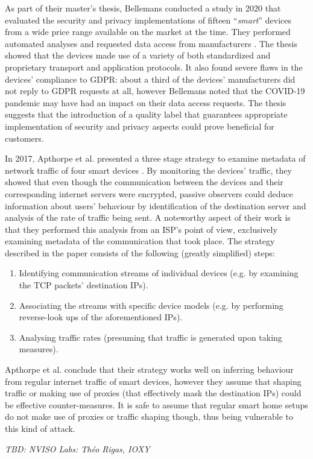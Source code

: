 As part of their master's thesis, Bellemans conducted a study in 2020 that evaluated the security and privacy implementations of fifteen \enquote{\emph{smart}} devices from a wide price range available on the market at the time. They performed automated analyses and requested data access from manufacturers \cite{JonahBellemans}. The thesis showed that the devices made use of a variety of both standardized and proprietary transport and application protocols. It also found severe flaws in the devices' compliance to \ac{GDPR}: about a third of the devices' manufacturers did not reply to \ac{GDPR} requests at all, however Bellemans noted that the COVID-19 pandemic may have had an impact on their data access requests. The thesis suggests that the introduction of a quality label that guarantees appropriate implementation of security and privacy aspects could prove beneficial for customers. \par
In 2017, Apthorpe et al. presented a three stage strategy to examine metadata of network traffic of four smart devices \cite{apthorpe2017smart}. %
By monitoring the devices' traffic, they showed that even though the communication between the devices and their corresponding internet servers were encrypted, passive observers could deduce information about users' behaviour by identification of the destination server and analysis of the rate of traffic being sent. A noteworthy aspect of their work is that they performed this analysis from an \ac{ISP}'s point of view, exclusively examining metadata of the communication that took place. The strategy described in the paper consists of the following (greatly simplified) steps:
\begin{enumerate}
    \item Identifying communication streams of individual devices (e.g. by examining the TCP packets' destination IPs).
    \item Associating the streams with specific device models (e.g. by performing reverse-look ups of the aforementioned IPs).
    \item Analysing traffic rates (presuming that traffic is generated upon taking measures).
\end{enumerate}


Apthorpe et al. conclude that their strategy works well on inferring behaviour from regular internet traffic of smart devices, however they assume that shaping traffic or making use of proxies (that effectively mask the destination IPs) could be effective counter-measures. It is safe to assume that regular smart home setups do not make use of proxies or traffic shaping though, thus being vulnerable to this kind of attack. \par
\emph{TBD: NVISO Labs: Théo Rigas, IOXY \cite{rigas_ioxy}} %